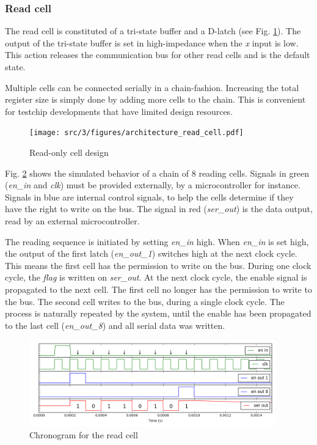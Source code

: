 \subsubsection{Read cell}

The read cell is constituted of a tri-state buffer and a D-latch (see Fig. \ref{fig:read-cell-design}).
The output of the tri-state buffer is set in high-impedance when the \textit{x} input is low.
This action releases the communication bus for other read cells and is the default state.

Multiple cells can be connected serially in a chain-fashion.
Increasing the total register size is simply done by adding more cells to the chain.
This is convenient for testchip developments that have limited design resources.

\begin{figure}[!h]
  \centering
  \texttt{[image: src/3/figures/architecture\_read\_cell.pdf]}
  \caption{Read-only cell design}
  \label{fig:read-cell-design}
\end{figure}

Fig. \ref{fig:read-cell-curve} shows the simulated behavior of a chain of 8 reading cells.
Signals in green (\textit{en\_in} and \textit{clk}) must be provided externally, by a microcontroller for instance.
Signals in blue are internal control signals, to help the cells determine if they have the right to write on the bus.
The signal in red (\textit{ser\_out}) is the data output, read by an external microcontroller.

The reading sequence is initiated by setting \textit{en\_in} high.
When \textit{en\_in} is set high, the output of the first latch (\textit{en\_out\_1}) switches high at the next clock cycle.
This means the first cell has the permission to write on the bus.
During one clock cycle, the \textit{flag} is written on \textit{ser\_out}.
At the next clock cycle, the enable signal is propagated to the next cell.
The first cell no longer has the permission to write to the bus.
The second cell writes to the bus, during a single clock cycle.
The process is naturally repeated by the system, until the enable has been propagated to the last cell (\textit{en\_out\_8}) and all serial data was written.

\begin{figure}[!h]
  \centering
  \includegraphics[width=0.95\textwidth]{src/3/figures/curve_read_cell.png}
  \caption{Chronogram for the read cell}
  \label{fig:read-cell-curve}
\end{figure}

